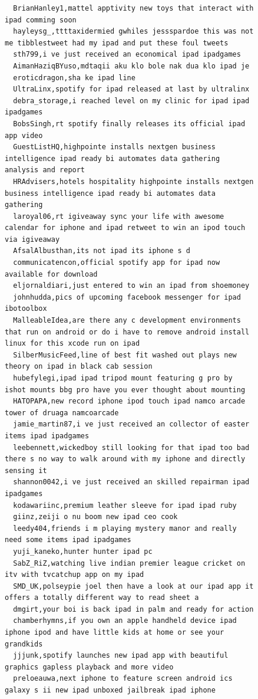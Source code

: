 \begin{figure}[htpb]
\begin{verbatim}
  BrianHanley1,mattel apptivity new toys that interact with ipad comming soon
  hayleysg_,ttttaxidermied gwhiles jessspardoe this was not me tibblestweet had my ipad and put these foul tweets
  sth799,i ve just received an economical ipad ipadgames
  AimanHaziqBYuso,mdtaqii aku klo bole nak dua klo ipad je
  eroticdragon,sha ke ipad line
  UltraLinx,spotify for ipad released at last by ultralinx
  debra_storage,i reached level on my clinic for ipad ipad ipadgames
  BobsSingh,rt spotify finally releases its official ipad app video
  GuestListHQ,highpointe installs nextgen business intelligence ipad ready bi automates data gathering analysis and report
  HRAdvisers,hotels hospitality highpointe installs nextgen business intelligence ipad ready bi automates data gathering
  laroyal06,rt igiveaway sync your life with awesome calendar for iphone and ipad retweet to win an ipod touch via igiveaway
  AfsalAlbusthan,its not ipad its iphone s d
  communicatencon,official spotify app for ipad now available for download
  eljornaldiari,just entered to win an ipad from shoemoney
  johnhudda,pics of upcoming facebook messenger for ipad ibotoolbox
  MalleableIdea,are there any c development environments that run on android or do i have to remove android install linux for this xcode run on ipad
  SilberMusicFeed,line of best fit washed out plays new theory on ipad in black cab session
  hubefylegi,ipad ipad tripod mount featuring g pro by ishot mounts bbg pro have you ever thought about mounting
  HATOPAPA,new record iphone ipod touch ipad namco arcade tower of druaga namcoarcade
  jamie_martin87,i ve just received an collector of easter items ipad ipadgames
  leebennett,wickedboy still looking for that ipad too bad there s no way to walk around with my iphone and directly sensing it
  shannon0042,i ve just received an skilled repairman ipad ipadgames
  kodawariinc,premium leather sleeve for ipad ipad ruby
  giinz,zeiji o nu boom new ipad ceo cook
  leedy404,friends i m playing mystery manor and really need some items ipad ipadgames
  yuji_kaneko,hunter hunter ipad pc
  SabZ_RiZ,watching live indian premier league cricket on itv with tvcatchup app on my ipad
  SMD_UK,polseypie joel then have a look at our ipad app it offers a totally different way to read sheet a
  dmgirt,your boi is back ipad in palm and ready for action
  chamberhymns,if you own an apple handheld device ipad iphone ipod and have little kids at home or see your grandkids
  jjjunk,spotify launches new ipad app with beautiful graphics gapless playback and more video
  preloeauwa,next iphone to feature screen android ics galaxy s ii new ipad unboxed jailbreak ipad iphone

\end{verbatim}
\end{figure}
